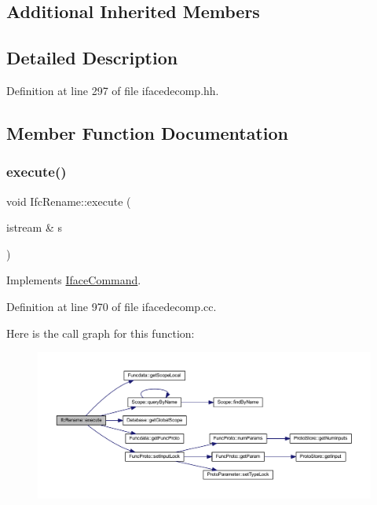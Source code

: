 \subsection*{Additional Inherited Members}


\subsection{Detailed Description}


Definition at line 297 of file ifacedecomp.\+hh.



\subsection{Member Function Documentation}
\mbox{\label{class_ifc_rename_a7c7b89bc0716bd3c4e7efc6c28cff73a}} 
\subsubsection{\texorpdfstring{execute()}{execute()}}
{\footnotesize\ttfamily void Ifc\+Rename\+::execute (\begin{DoxyParamCaption}\item[{istream \&}]{s }\end{DoxyParamCaption})\hspace{0.3cm}{\ttfamily [virtual]}}



Implements \mbox{\hyperlink{class_iface_command_af10e29cee2c8e419de6efe9e680ad201}{Iface\+Command}}.



Definition at line 970 of file ifacedecomp.\+cc.

Here is the call graph for this function\+:
\nopagebreak
\begin{figure}[H]
\begin{center}
\leavevmode
\includegraphics[width=350pt]{class_ifc_rename_a7c7b89bc0716bd3c4e7efc6c28cff73a_cgraph}
\end{center}
\end{figure}


